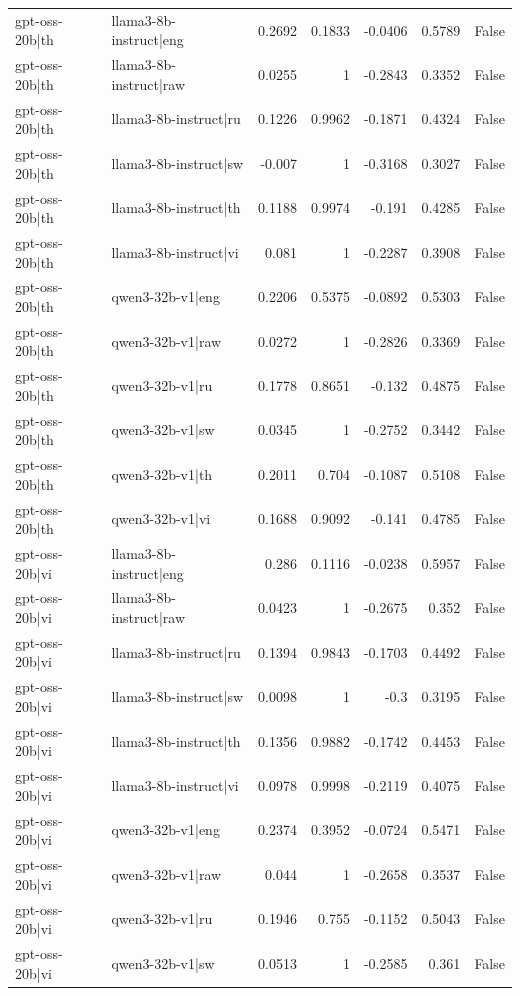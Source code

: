 \begin{table}
\begin{tabular}{l l r r r r l}
gpt-oss-20b|th & llama3-8b-instruct|eng & 0.2692 & 0.1833 & -0.0406 & 0.5789 & False \\
gpt-oss-20b|th & llama3-8b-instruct|raw & 0.0255 & 1 & -0.2843 & 0.3352 & False \\
gpt-oss-20b|th & llama3-8b-instruct|ru & 0.1226 & 0.9962 & -0.1871 & 0.4324 & False \\
gpt-oss-20b|th & llama3-8b-instruct|sw & -0.007 & 1 & -0.3168 & 0.3027 & False \\
gpt-oss-20b|th & llama3-8b-instruct|th & 0.1188 & 0.9974 & -0.191 & 0.4285 & False \\
gpt-oss-20b|th & llama3-8b-instruct|vi & 0.081 & 1 & -0.2287 & 0.3908 & False \\
gpt-oss-20b|th & qwen3-32b-v1|eng & 0.2206 & 0.5375 & -0.0892 & 0.5303 & False \\
gpt-oss-20b|th & qwen3-32b-v1|raw & 0.0272 & 1 & -0.2826 & 0.3369 & False \\
gpt-oss-20b|th & qwen3-32b-v1|ru & 0.1778 & 0.8651 & -0.132 & 0.4875 & False \\
gpt-oss-20b|th & qwen3-32b-v1|sw & 0.0345 & 1 & -0.2752 & 0.3442 & False \\
gpt-oss-20b|th & qwen3-32b-v1|th & 0.2011 & 0.704 & -0.1087 & 0.5108 & False \\
gpt-oss-20b|th & qwen3-32b-v1|vi & 0.1688 & 0.9092 & -0.141 & 0.4785 & False \\
gpt-oss-20b|vi & llama3-8b-instruct|eng & 0.286 & 0.1116 & -0.0238 & 0.5957 & False \\
gpt-oss-20b|vi & llama3-8b-instruct|raw & 0.0423 & 1 & -0.2675 & 0.352 & False \\
gpt-oss-20b|vi & llama3-8b-instruct|ru & 0.1394 & 0.9843 & -0.1703 & 0.4492 & False \\
gpt-oss-20b|vi & llama3-8b-instruct|sw & 0.0098 & 1 & -0.3 & 0.3195 & False \\
gpt-oss-20b|vi & llama3-8b-instruct|th & 0.1356 & 0.9882 & -0.1742 & 0.4453 & False \\
gpt-oss-20b|vi & llama3-8b-instruct|vi & 0.0978 & 0.9998 & -0.2119 & 0.4075 & False \\
gpt-oss-20b|vi & qwen3-32b-v1|eng & 0.2374 & 0.3952 & -0.0724 & 0.5471 & False \\
gpt-oss-20b|vi & qwen3-32b-v1|raw & 0.044 & 1 & -0.2658 & 0.3537 & False \\
gpt-oss-20b|vi & qwen3-32b-v1|ru & 0.1946 & 0.755 & -0.1152 & 0.5043 & False \\
gpt-oss-20b|vi & qwen3-32b-v1|sw & 0.0513 & 1 & -0.2585 & 0.361 & False \\

\end{tabular}
\end{table}
